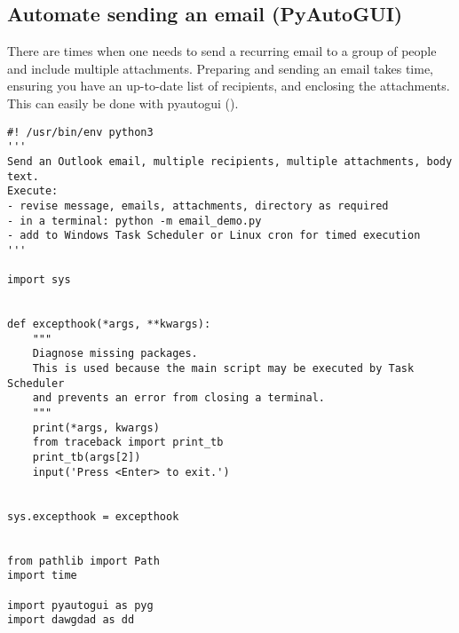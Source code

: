 \documentclass[10pt, letterpaper, twoside]{article}
\begin{document}
\subsection{Automate sending an email (PyAutoGUI)}\label{sec:automate_sending_an_email}
There are times when one needs to send a recurring email to a group of people and include multiple attachments. Preparing and sending an email takes time, ensuring you have an up-to-date list of recipients, and enclosing the attachments. This can easily be done with \Gls{pyautogui} (\cite{pyautogui}).
\begin{footnotesize}
\begin{verbatim}
#! /usr/bin/env python3
'''
Send an Outlook email, multiple recipients, multiple attachments, body text.
Execute:
- revise message, emails, attachments, directory as required
- in a terminal: python -m email_demo.py
- add to Windows Task Scheduler or Linux cron for timed execution
'''

import sys


def excepthook(*args, **kwargs):
    """
    Diagnose missing packages.
    This is used because the main script may be executed by Task Scheduler
    and prevents an error from closing a terminal.
    """
    print(*args, kwargs)
    from traceback import print_tb
    print_tb(args[2])
    input('Press <Enter> to exit.')


sys.excepthook = excepthook


from pathlib import Path
import time

import pyautogui as pyg
import dawgdad as dd



\end{verbatim}
\end{footnotesize}
\end{document}

